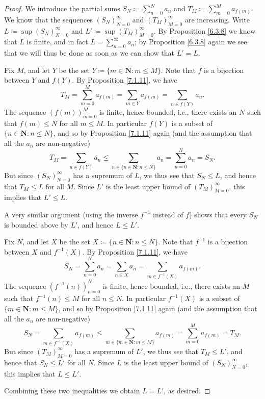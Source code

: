 \begin{proof}
We introduce the partial sums \(S_N \coloneqq \sum_{n = 0}^N a_n\) and \(T_M \coloneqq \sum_{m = 0}^M a_{f(m)}\).
We know that the sequences \((S_N)_{N = 0}^\infty\) and \((T_M)_{M = 0}^\infty\) are increasing.
Write \(L \coloneqq \sup(S_N)_{N = 0}^\infty\) and \(L' \coloneqq \sup(T_M)_{M = 0}^\infty\).
By Proposition \ref{6.3.8} we know that \(L\) is finite, and in fact \(L = \sum_{n = 0}^\infty a_n\);
by Proposition \ref{6.3.8} again we see that we will thus be done as soon as we can show that \(L' = L\).

Fix \(M\), and let \(Y\) be the set \(Y \coloneqq \{m \in \mathbf{N} : m \leq M\}\).
Note that \(f\) is a bijection between \(Y\) and \(f(Y)\).
By Proposition \ref{7.1.11}, we have
\[
    T_M = \sum_{m = 0}^M a_{f(m)} = \sum_{m \in Y} a_{f(m)} = \sum_{n \in f(Y)} a_n.
\]
The sequence \((f(m))_{m = 0}^M\) is finite, hence bounded, i.e., there exists an \(N\) such that \(f(m) \leq N\) for all \(m \leq M\).
In particular \(f(Y)\) is a subset of \(\{n \in \mathbf{N} : n \leq N\}\), and so by Proposition \ref{7.1.11} again (and the assumption that all the \(a_n\) are non-negative)
\[
    T_M = \sum_{n \in f(Y)} a_n \leq \sum_{n \in \{n \in \mathbf{N} : n \leq N\}} a_n = \sum_{n = 0}^N a_n = S_N.
\]
But since \((S_N)_{N = 0}^\infty\) has a supremum of \(L\), we thus see that \(S_N \leq L\), and hence that \(T_M \leq L\) for all \(M\).
Since \(L'\) is the least upper bound of \((T_M)_{M = 0}^\infty\), this implies that \(L' \leq L\).

A very similar argument (using the inverse \(f^{-1}\) instead of \(f\)) shows that every \(S_N\) is bounded above by \(L'\), and hence \(L \leq L'\).

Fix \(N\), and let \(X\) be the set \(X \coloneqq \{n \in \mathbf{N} : n \leq N\}\).
Note that \(f^{-1}\) is a bijection between \(X\) and \(f^{-1}(X)\).
By Proposition \ref{7.1.11}, we have
\[
    S_N = \sum_{n = 0}^N a_n = \sum_{n \in X} a_n = \sum_{m \in f^{-1}(X)} a_{f(m)}.
\]
The sequence \((f^{-1}(n))_{n = 0}^N\) is finite, hence bounded, i.e., there exists an \(M\) such that \(f^{-1}(n) \leq M\) for all \(n \leq N\).
In particular \(f^{-1}(X)\) is a subset of \(\{m \in \mathbf{N} : m \leq M\}\), and so by Proposition \ref{7.1.11} again (and the assumption that all the \(a_n\) are non-negative)
\[
    S_N = \sum_{m \in f^{-1}(X)} a_{f(m)} \leq \sum_{m \in \{m \in \mathbf{N} : m \leq M\}} a_{f(m)} = \sum_{m = 0}^M a_{f(m)} = T_M.
\]
But since \((T_M)_{M = 0}^\infty\) has a supremum of \(L'\), we thus see that \(T_M \leq L'\), and hence that \(S_N \leq L'\) for all \(N\).
Since \(L\) is the least upper bound of \((S_N)_{N = 0}^\infty\), this implies that \(L \leq L'\).

Combining these two inequalities we obtain \(L = L'\), as desired.
\end{proof}

